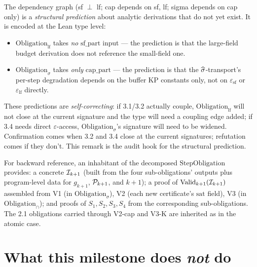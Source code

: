 \begin{remark}
\label{rem:encoded-unverified}
The dependency graph (sf $\perp$ lf; cap depends on sf, lf; sigma
depends on cap only) is a \emph{structural prediction} about
analytic derivations that do not yet exist.  It is encoded at the
Lean type level:
\begin{itemize}
\item $\mathrm{Obligation}_{\mathrm{lf}}$ takes \emph{no}
  $\mathrm{sf\_part}$ input --- the prediction is that the
  large-field budget derivation does not reference the small-field
  one.
\item $\mathrm{Obligation}_{\sigma}$ takes \emph{only}
  $\mathrm{cap\_part}$ --- the prediction is that the
  $\widehat{\sigma}$-transport's per-step degradation depends on the buffer
  KP constants only, not on $\varepsilon_{\mathrm{sf}}$ or
  $\varepsilon_{\mathrm{lf}}$ directly.
\end{itemize}
These predictions are \emph{self-correcting}: if 3.1/3.2 actually
couple, $\mathrm{Obligation}_{\mathrm{lf}}$ will not close at the
current signature and the type will need a coupling edge added; if
3.4 needs direct $\varepsilon$-access, $\mathrm{Obligation}_{\sigma}$'s
signature will need to be widened.  Confirmation comes when 3.2 and
3.4 close at the current signatures; refutation comes if they don't.
This remark is the audit hook for the structural prediction.
\end{remark}

\begin{remark}
\label{rem:atomic-obligation}
For backward reference, an inhabitant of the decomposed
$\mathrm{StepObligation}$ provides: a concrete $\mathcal{I}_{k+1}$ (built
from the four sub-obligations' outputs plus program-level data for
$g_{k+1}$, $\mathcal{P}_{k+1}$, and $k+1$); a proof of
$\mathrm{Valid}_{k+1}(\mathcal{I}_{k+1})$ assembled from V1 (in
$\mathrm{Obligation}_{\sigma}$), V2 (each new certificate's
$\mathrm{sat}$ field), V3 (in $\mathrm{Obligation}_{\cap}$); and
proofs of $S_1, S_2, S_3, S_4$ from the corresponding
sub-obligations.  The 2.1 obligations carried through V2-cap and
V3-K are inherited as in the atomic case.
\end{remark}

\section{What this milestone does \emph{not} do}
\label{sec:scope}

